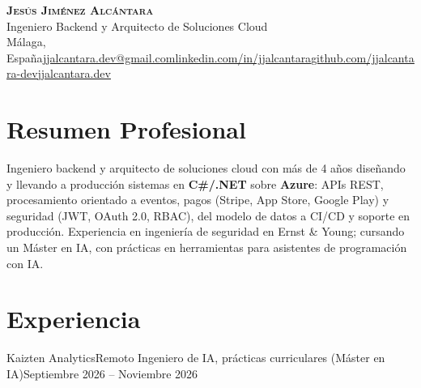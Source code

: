 \documentclass[a4paper,10pt]{article}
\begin{document}
\begin{center}
    \textbf{\Huge \scshape Jesús Jiménez Alcántara} \\ \vspace{2pt}
    {\large Ingeniero Backend y Arquitecto de Soluciones Cloud}\hspace{0.6em}{\textbar}\hspace{0.6em}{\normalsize .NET $\cdot$ Azure $\cdot$ DevOps $\cdot$ IA} \\ \vspace{3pt}
    {\footnotesize Málaga, España\cvsep\cvphoneitem\href{mailto:jjalcantara.dev@gmail.com}{\underline{jjalcantara.dev@gmail.com}}\cvsep\href{https://linkedin.com/in/jjalcantara}{\underline{linkedin.com/in/jjalcantara}}\cvsep\href{https://github.com/jjalcantara-dev}{\underline{github.com/jjalcantara-dev}}\cvsep\href{https://jjalcantara.dev}{\underline{jjalcantara.dev}}}
\end{center}

\vspace{-6pt}

\section{Resumen Profesional}
\small
\noindent Ingeniero backend y arquitecto de soluciones cloud con más de 4 años diseñando y llevando a producción sistemas en
\textbf{C\#/.NET} sobre \textbf{Azure}: APIs REST, procesamiento orientado a eventos, pagos (Stripe, App Store, Google Play) y
seguridad (JWT, OAuth 2.0, RBAC), del modelo de datos a CI/CD y soporte en producción. Experiencia en ingeniería de seguridad
en Ernst \& Young; cursando un Máster en IA, con prácticas en herramientas para asistentes de programación con IA.

\vspace{-2pt}

\section{Experiencia}
  \resumeSubHeadingListStart

    \resumeSubheading
      {Kaizten Analytics}{Remoto}
      {Ingeniero de IA, prácticas curriculares (Máster en IA)}{Septiembre 2026 -- Noviembre 2026}
    \resumeItemListStart
    \resumeItemListEnd
\end{document}
